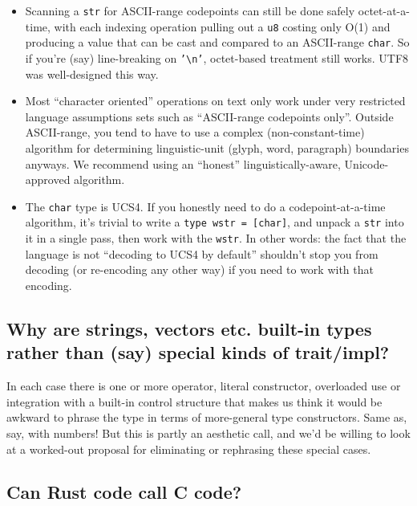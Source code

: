 \documentclass[]{article}
\begin{document}
\begin{itemize}
\itemsep1pt\parskip0pt
\item
  Scanning a \texttt{str} for ASCII-range codepoints can still be done
  safely octet-at-a-time, with each indexing operation pulling out a
  \texttt{u8} costing only O(1) and producing a value that can be cast
  and compared to an ASCII-range \texttt{char}. So if you're (say)
  line-breaking on \texttt{'\textbackslash{}n'}, octet-based treatment
  still works. UTF8 was well-designed this way.
\item
  Most ``character oriented'' operations on text only work under very
  restricted language assumptions sets such as ``ASCII-range codepoints
  only''. Outside ASCII-range, you tend to have to use a complex
  (non-constant-time) algorithm for determining linguistic-unit (glyph,
  word, paragraph) boundaries anyways. We recommend using an ``honest''
  linguistically-aware, Unicode-approved algorithm.
\item
  The \texttt{char} type is UCS4. If you honestly need to do a
  codepoint-at-a-time algorithm, it's trivial to write a
  \texttt{type wstr = {[}char{]}}, and unpack a \texttt{str} into it in
  a single pass, then work with the \texttt{wstr}. In other words: the
  fact that the language is not ``decoding to UCS4 by default''
  shouldn't stop you from decoding (or re-encoding any other way) if you
  need to work with that encoding.
\end{itemize}

\subsection{Why are strings, vectors etc. built-in types rather than
(say) special kinds of
trait/impl?}\label{why-are-strings-vectors-etc.-built-in-types-rather-than-say-special-kinds-of-traitimpl}

In each case there is one or more operator, literal constructor,
overloaded use or integration with a built-in control structure that
makes us think it would be awkward to phrase the type in terms of
more-general type constructors. Same as, say, with numbers! But this is
partly an aesthetic call, and we'd be willing to look at a worked-out
proposal for eliminating or rephrasing these special cases.

\subsection{Can Rust code call C code?}\label{can-rust-code-call-c-code}
\end{document}
